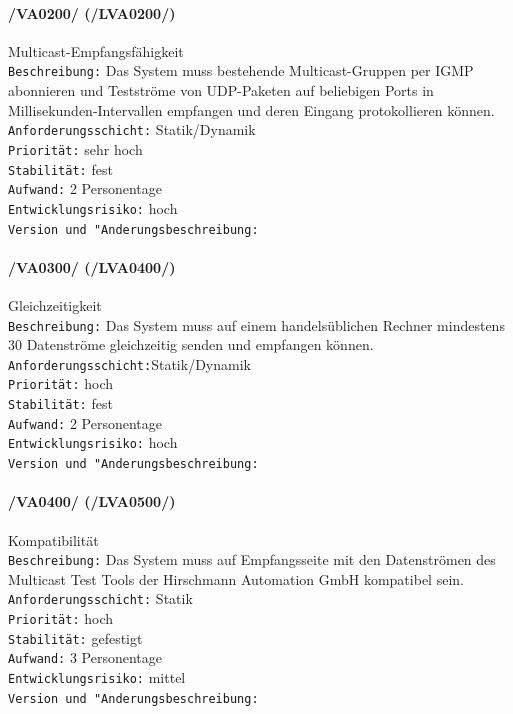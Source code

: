 \paragraph{/VA0200/ (/LVA0200/)} Multicast-Empfangsfähigkeit\\
\texttt{Beschreibung:} Das System muss bestehende Multicast-Gruppen
per IGMP abonnieren und Testströme von UDP-Paketen auf beliebigen Ports in
Millisekunden-Intervallen empfangen und deren Eingang protokollieren können.\\
\texttt{Anforderungsschicht:} Statik/Dynamik\\
\texttt{Priorität:} sehr hoch\\
\texttt{Stabilität:} fest\\
\texttt{Aufwand:} 2 Personentage\\
\texttt{Entwicklungsrisiko:} hoch\\
\texttt{Version und "Anderungsbeschreibung:}

\paragraph{/VA0300/ (/LVA0400/)} Gleichzeitigkeit\\
\texttt{Beschreibung:} Das System muss auf einem handelsüblichen Rechner
mindestens 30 Datenströme gleichzeitig senden und empfangen können.\\
\texttt{Anforderungsschicht:}Statik/Dynamik\\
\texttt{Priorität:} hoch\\
\texttt{Stabilität:} fest\\
\texttt{Aufwand:} 2 Personentage\\
\texttt{Entwicklungsrisiko:} hoch\\
\texttt{Version und "Anderungsbeschreibung:}

\paragraph{/VA0400/ (/LVA0500/)} Kompatibilität\\
\texttt{Beschreibung:} Das System muss auf Empfangsseite
mit den Datenströmen des Multicast Test Tools der Hirschmann Automation GmbH
kompatibel sein.\\
\texttt{Anforderungsschicht:} Statik\\
\texttt{Priorität:} hoch\\
\texttt{Stabilität:} gefestigt\\
\texttt{Aufwand:} 3 Personentage\\
\texttt{Entwicklungsrisiko:} mittel\\
\texttt{Version und "Anderungsbeschreibung:}

